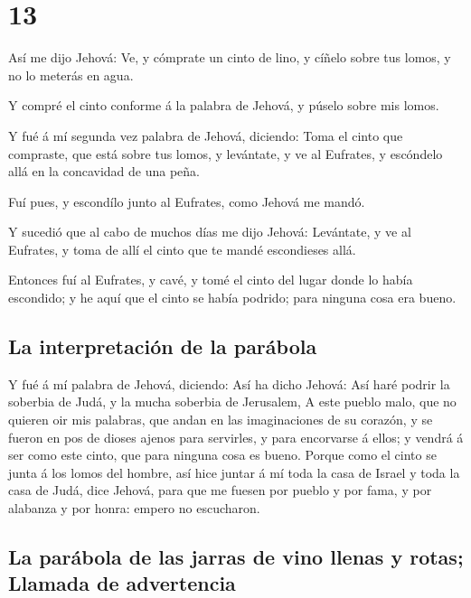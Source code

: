 \hypertarget{section-12}{%
\section{13}\label{section-12}}

 Así me dijo Jehová: Ve, y cómprate un cinto de lino, y
cíñelo sobre tus lomos, y no lo meterás en agua.

 Y compré el cinto conforme á la palabra de Jehová, y
púselo sobre mis lomos.

 Y fué á mí segunda vez palabra de Jehová, diciendo:
 Toma el cinto que compraste, que está sobre tus lomos, y
levántate, y ve al Eufrates, y escóndelo allá en la concavidad de una
peña.

 Fuí pues, y escondílo junto al Eufrates, como Jehová me
mandó.

 Y sucedió que al cabo de muchos días me dijo Jehová:
Levántate, y ve al Eufrates, y toma de allí el cinto que te mandé
escondieses allá.

 Entonces fuí al Eufrates, y cavé, y tomé el cinto del
lugar donde lo había escondido; y he aquí que el cinto se había podrido;
para ninguna cosa era bueno.

\hypertarget{la-interpretaciuxf3n-de-la-paruxe1bola}{%
\subsection{La interpretación de la
parábola}\label{la-interpretaciuxf3n-de-la-paruxe1bola}}

 Y fué á mí palabra de Jehová, diciendo: 
Así ha dicho Jehová: Así haré podrir la soberbia de Judá, y la mucha
soberbia de Jerusalem,  A este pueblo malo, que no
quieren oir mis palabras, que andan en las imaginaciones de su corazón,
y se fueron en pos de dioses ajenos para servirles, y para encorvarse á
ellos; y vendrá á ser como este cinto, que para ninguna cosa es bueno.
 Porque como el cinto se junta á los lomos del hombre,
así hice juntar á mí toda la casa de Israel y toda la casa de Judá, dice
Jehová, para que me fuesen por pueblo y por fama, y por alabanza y por
honra: empero no escucharon.

\hypertarget{la-paruxe1bola-de-las-jarras-de-vino-llenas-y-rotas-llamada-de-advertencia}{%
\subsection{La parábola de las jarras de vino llenas y rotas; Llamada de
advertencia}\label{la-paruxe1bola-de-las-jarras-de-vino-llenas-y-rotas-llamada-de-advertencia}}

